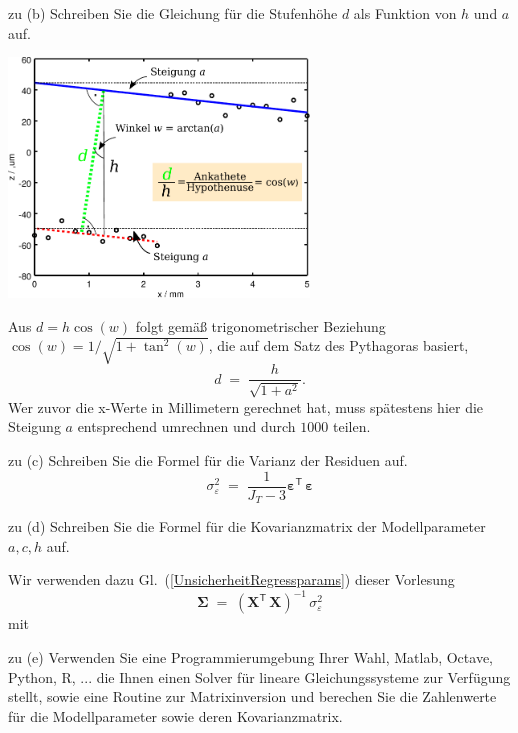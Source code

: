 zu (b) Schreiben Sie die Gleichung für die Stufenhöhe $d$ als Funktion von $h$ und $a$ auf.
\begin{center}
	\includegraphics[width=80mm]{02_vorlesung/media/uebungA5_step_plot_loesung.pdf}
\end{center}
Aus $d = h \cos(w)$ folgt gemäß trigonometrischer Beziehung $\cos(w) = 1 / \sqrt{1 + \tan^2(w)}$,
die auf dem Satz des Pythagoras basiert,
\begin{equation}
d \; = \; \frac{h}{\sqrt{1 + a^2}} .
\end{equation}
Wer zuvor die x-Werte in Millimetern gerechnet hat, muss spätestens hier die Steigung
$a$ entsprechend umrechnen und durch $1000$ teilen.

zu (c) Schreiben Sie die Formel für die Varianz der Residuen auf.
$$
\sigma_\varepsilon^2 \; = \; \frac{1}{J_T - 3} \boldsymbol \varepsilon^\mathsf{T} \, \boldsymbol \varepsilon
$$

zu (d) Schreiben Sie die Formel für die Kovarianzmatrix der Modellparameter
$a, c, h$ auf.

Wir verwenden dazu Gl.~(\ref{UnsicherheitRegressparams}) dieser Vorlesung
\begin{equation}
\boldsymbol \Sigma \; = \; \left( \mathbf{X}^\mathsf{T}  \, \mathbf{X} \right)^{-1} \, \sigma_\varepsilon^2
\end{equation}
mit

zu (e) Verwenden Sie eine Programmierumgebung Ihrer Wahl, Matlab, Octave, Python, R, ...
die Ihnen einen Solver für lineare Gleichungssysteme zur Verfügung stellt, sowie
eine Routine zur Matrixinversion und berechen Sie die Zahlenwerte für die Modellparameter
sowie deren Kovarianzmatrix.

